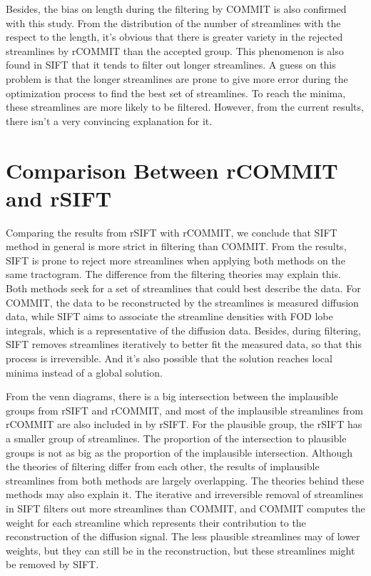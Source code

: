 Besides, the bias on length during the filtering by COMMIT is also confirmed with this study.
From the distribution of the number of streamlines with the respect to the length, it's obvious that 
there is greater variety in the rejected streamlines by rCOMMIT than the accepted group. 
This phenomenon is also found in SIFT that it tends to filter out longer streamlines.
A guess on this problem is that the longer streamlines are prone to give more error during the optimization process
to find the best set of streamlines. To reach the minima, these streamlines are more likely to be filtered. 
However, from the current results, there isn't a very convincing explanation for it. 

\section{Comparison Between rCOMMIT and rSIFT}

Comparing the results from rSIFT with rCOMMIT, we conclude that SIFT method in general is more strict in filtering than COMMIT. From the results, SIFT 
is prone to reject more streamlines when applying both methods on the same tractogram.  
The difference from the filtering theories may explain this. 
Both methods seek for a set of streamlines that could best describe the data. For COMMIT, the data to be reconstructed by the streamlines is measured diffusion data, while 
SIFT aims to associate the streamline densities with FOD lobe integrals, which is a representative of the diffusion data. Besides,
during filtering, SIFT removes streamlines iteratively to better fit the measured data, so that this process is irreversible. And it's 
also possible that the solution reaches local minima instead of a global solution.


From the venn diagrams, there is a big intersection between the implausible groups from rSIFT and rCOMMIT, 
and most of the implausible streamlines from rCOMMIT are also included in by rSIFT. For the plausible 
group, the rSIFT has a smaller group of streamlines. The proportion of the intersection to plausible groups is not 
as big as the proportion of the implausible intersection. Although the theories of filtering differ from each other,
the results of implausible streamlines from both methods are largely overlapping. 
The theories behind these methods may also explain it. The iterative and irreversible removal of streamlines in SIFT filters out more streamlines than COMMIT,
and COMMIT computes the weight for each streamline which represents their contribution to the reconstruction of the diffusion signal. 
The less plausible streamlines may of lower weights, but they can still be in the reconstruction, but these streamlines might be removed by SIFT.


